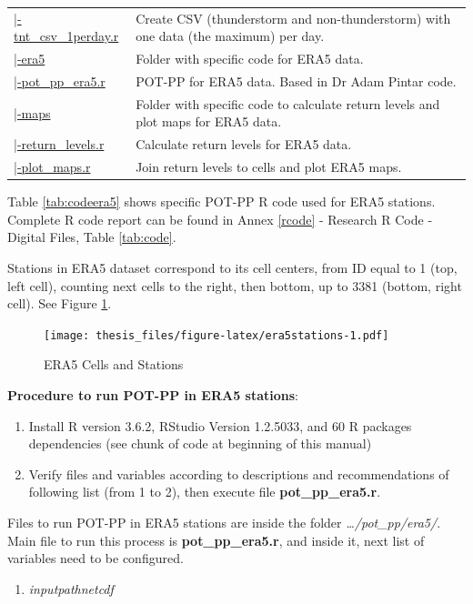 \documentclass[12pt,twoside]{reedthesis}
\providecommand{\tightlist}{%
  \setlength{\itemsep}{0pt}\setlength{\parskip}{0pt}}
\begin{document}
\begin{longtable}[t]{>{\raggedright\arraybackslash}p{1.3in}>{\raggedright\arraybackslash}p{4.9in}}
\href{ftp://ftp.geocorp.co/windthesis/code/pot_pp/write_t_nt_csv_one_data_per_day.r}{\;\;\;\;|-tnt\_csv\_1perday.r} & Create CSV (thunderstorm and non-thunderstorm) with one data (the maximum) per day.\\
\href{ftp://ftp.geocorp.co/windthesis/code/pot_pp/era5/}{\;\;\;\;|-era5} & Folder with specific code for ERA5 data.\\
\href{ftp://ftp.geocorp.co/windthesis/code/pot_pp/era5/pot_pp_era5.r}{\;\;\;\;\;\;|-pot\_pp\_era5.r} & POT-PP for ERA5 data. Based in Dr Adam Pintar code.\\
\href{ftp://ftp.geocorp.co/windthesis/code/pot_pp/era5/maps/}{\;\;\;\;\;\;|-maps} & Folder with specific code to calculate return levels and plot maps for ERA5 data.\\
\href{ftp://ftp.geocorp.co/windthesis/code/pot_pp/era5/maps/return_levels.r}{\;\;\;\;\;\;\;\;|-return\_levels.r} & Calculate return levels for ERA5 data.\\
\href{ftp://ftp.geocorp.co/windthesis/code/pot_pp/era5/maps/plot_maps.r}{\;\;\;\;\;\;\;\;|-plot\_maps.r} & Join return levels to cells and plot ERA5 maps.\\
\bottomrule
\end{longtable}
\endgroup{}

Table \ref{tab:codeera5} shows specific POT-PP R code used for ERA5 stations. Complete R code report can be found in Annex \ref{rcode} - Research R Code - Digital Files, Table \ref{tab:code}.

Stations in ERA5 dataset correspond to its cell centers, from ID equal to 1 (top, left cell), counting next cells to the right, then bottom, up to 3381 (bottom, right cell). See Figure \ref{fig:era5stations}.
\begin{figure}
\centering
\texttt{[image: thesis\_files/figure-latex/era5stations-1.pdf]}
\caption{\label{fig:era5stations}ERA5 Cells and Stations}
\end{figure}
\textbf{Procedure to run POT-PP in ERA5 stations}:
\begin{enumerate}
\def\labelenumi{\arabic{enumi}.}
\item
  Install R version 3.6.2, RStudio Version 1.2.5033, and 60 R packages dependencies (see chunk of code at beginning of this manual)
\item
  Verify files and variables according to descriptions and recommendations of following list (from 1 to 2), then execute file \textbf{pot\_pp\_era5.r}.
\end{enumerate}
Files to run POT-PP in ERA5 stations are inside the folder \emph{\ldots/pot\_pp/era5/}. Main file to run this process is \textbf{pot\_pp\_era5.r}, and inside it, next list of variables need to be configured.
\begin{enumerate}
\def\labelenumi{\arabic{enumi}.}
\tightlist
\item
  \emph{inputpathnetcdf}
\end{enumerate}
\scriptsize
\end{document}
